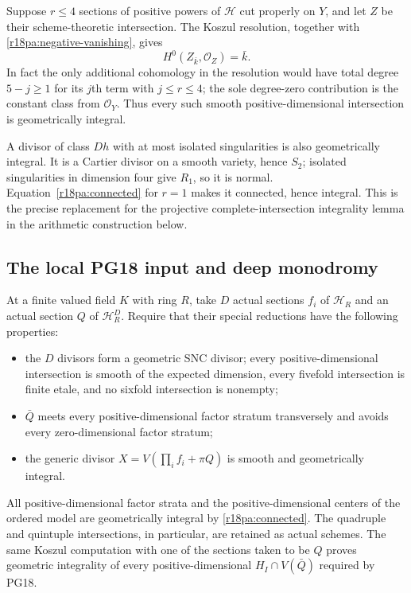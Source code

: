 Suppose $r\le4$ sections of positive powers
of $\mathcal H$ cut properly on $Y$, and
let $Z$ be their scheme-theoretic intersection.
The Koszul resolution, together with
\eqref{r18pa:negative-vanishing}, gives
\[
                         H^0(Z_{\bar k},\mathcal O_Z)=\bar k.
 \tag{PA18.4}\label{r18pa:connected}
\]
In fact the only additional cohomology in the
resolution would have total degree $5-j\ge1$
for its $j$th term with $j\le r\le4$;
the sole degree-zero contribution is the
constant class from $\mathcal O_Y$.
Thus every such smooth positive-dimensional
intersection is geometrically integral.

A divisor of class $D h$ with at most isolated
singularities is also geometrically integral.
It is a Cartier divisor on a smooth variety,
hence $S_2$; isolated singularities in dimension
four give $R_1$, so it is normal.
Equation~\eqref{r18pa:connected} for $r=1$
makes it connected, hence integral.
This is the precise replacement for the
projective complete-intersection integrality
lemma in the arithmetic construction below.

\subsection{The local PG18 input and deep monodromy}

At a finite valued field $K$ with ring $R$, take
$D$ actual sections $f_i$ of $\mathcal H_R$ and
an actual section $Q$ of $\mathcal H_R^D$.
Require that their special reductions have the
following properties:
\begin{itemize}
\item the $D$ divisors form a geometric SNC divisor;
      every positive-dimensional intersection is
      smooth of the expected dimension, every
      fivefold intersection is finite etale, and
      no sixfold intersection is nonempty;
\item $\bar Q$ meets every positive-dimensional
      factor stratum transversely and avoids
      every zero-dimensional factor stratum;
\item the generic divisor
      $X=V(\prod_i f_i+\pi Q)$ is smooth and
      geometrically integral.
\end{itemize}
All positive-dimensional factor strata and the
positive-dimensional centers of the ordered
model are geometrically integral by
\eqref{r18pa:connected}.  The quadruple and
quintuple intersections, in particular, are
retained as actual schemes.
The same Koszul computation with one of the
sections taken to be $Q$ proves geometric
integrality of every positive-dimensional
$H_I\cap V(\bar Q)$ required by PG18.


